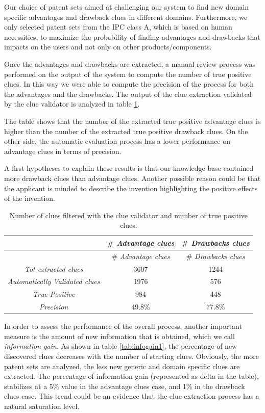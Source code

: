 \documentclass[]{book}
\begin{document}
Our choice of patent sets aimed at challenging our system to find new
domain specific advantages and drawback clues in different domains.
Furthermore, we only selected patent sets from the IPC class A, which is
based on human necessities, to maximize the probability of finding
advantages and drawbacks that impacts on the users and not only on other
products/components.

Once the advantages and drawbacks are extracted, a manual review process
was performed on the output of the system to compute the number of true
positive clues. In this way we were able to compute the precision of the
process for both the advantages and the drawbacks. The output of the
clue extraction validated by the clue validator is analyzed in table
\ref{tab:advdrwarticlecluemeas}.

The table shows that the number of the extracted true positive advantage
clues is higher than the number of the extracted true positive drawback
clues. On the other side, the automatic evaluation process has a lower
performance on advantage clues in terms of precision.

A first hypotheses to explain these results is that our knowledge base
contained more drawback clues than advantage clues. Another possible
reason could be that the applicant is minded to describe the invention
highlighting the positive effects of the invention.

\begin{longtable}[]{@{}ccc@{}}
\caption{\label{tab:advdrwarticlecluemeas} Number of clues filtered with the
clue validator and number of true positive clues.}\tabularnewline
\toprule
& \# \emph{Advantage clues} & \# \emph{Drawbacks clues}\tabularnewline
\midrule
\endfirsthead
\toprule
& \# \emph{Advantage clues} & \# \emph{Drawbacks clues}\tabularnewline
\midrule
\endhead
\emph{Tot extracted clues} & 3607 & 1244\tabularnewline
\emph{Automatically Validated clues} & 1976 & 576\tabularnewline
\emph{True Positive} & 984 & 448\tabularnewline
\emph{Precision} & 49.8\% & 77.8\%\tabularnewline
\bottomrule
\end{longtable}

In order to assess the performance of the overall process, another
important measure is the amount of new information that is obtained,
which we call \emph{information gain}. As shown in table
\ref{tab:infogain1}, the percentage of new discovered clues decreases
with the number of starting clues. Obviously, the more patent sets are
analyzed, the less new generic and domain specific clues are extracted.
The percentage of information gain (represented as delta in the table),
stabilizes at a 5\% value in the advantage clues case, and 1\% in the
drawback clues case. This trend could be an evidence that the clue
extraction process has a natural saturation level.
\end{document}
